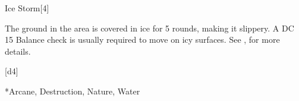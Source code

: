 \begin{spellsection}{Ice Storm}[4]
    \begin{spellheader}
    \end{spellheader}
    \begin{spellcontent}
        \begin{spelltargetinginfo}
        \end{spelltargetinginfo}
        \begin{spelleffects}
            \spelleffect The ground in the area is covered in ice for 5 rounds, making it slippery. A DC 15 Balance check is usually required to move on icy surfaces. See , for more details.
        \end{spelleffects}
    \end{spellcontent}
    \begin{spellsubcontent}
        \begin{spelltargetinginfo}
        \end{spelltargetinginfo}
        \begin{spelleffects}
            \spelleffect {}[d4]
        \end{spelleffects}
    \end{spellsubcontent}
    \begin{spellfooter}
        *{Arcane, Destruction, Nature, Water}
        \spellnotes \destructivespellnotes
        \miscastyou
    \end{spellfooter}
\end{spellsection}

